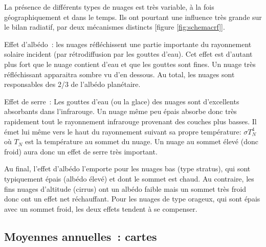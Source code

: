 \sk
La présence de différents types de nuages est très variable, à la fois géographiquement et dans le temps. Ils ont pourtant une influence très grande sur le bilan radiatif, par deux mécanismes distincts [figure \ref{fig:schemacrf}].
\begin{finger}
\item Effet d'albédo~: les nuages réfléchissent une partie importante du rayonnement solaire incident (par rétro\-diffusion par les gouttes d'eau). Cet effet est d'autant plus fort que le nuage contient d'eau et que les gouttes sont fines. Un nuage très réfléchissant apparaitra sombre vu d'en dessous. Au total, les nuages sont responsables des 2/3 de l'albédo planétaire.
\item Effet de serre~: Les gouttes d'eau (ou la glace) des nuages sont d'excellents absorbants dans l'infrarouge. Un nuage même peu épais absorbe donc très rapidement tout le rayonnement infrarouge provenant des couches plus basses. Il émet lui même vers le haut du rayonnement suivant sa propre température: $\sigma T_N^4$ où $T_N$ est la température au sommet du nuage. Un nuage au sommet élevé (donc froid) aura donc un effet de serre très important.
\end{finger}
Au final, l'effet d'albédo l'emporte pour les nuages bas (type stratus), qui sont typiquement épais (albédo élevé) et dont le sommet est chaud. Au contraire, les fins nuages d'altitude (cirrus) ont un albédo faible mais un sommet très froid donc ont un effet net réchauffant. Pour les nuages de type orageux, qui sont épais avec un sommet froid, les deux effets tendent à se compenser.

\sk
\subsection{Moyennes annuelles~: cartes}

